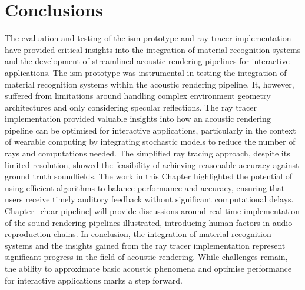 \section{Conclusions}
The evaluation and testing of the \acrshort{ism} prototype and ray tracer implementation have provided critical insights into the integration of material recognition systems and the development of streamlined acoustic rendering pipelines for interactive applications. The \acrshort{ism} prototype was instrumental in testing the integration of material recognition systems within the acoustic rendering pipeline. It, however, suffered from limitations around handling complex environment geometry architectures and only considering specular reflections. The ray tracer implementation provided valuable insights into how an acoustic rendering pipeline can be optimised for interactive applications, particularly in the context of wearable computing by integrating stochastic models to reduce the number of rays and computations needed. The simplified ray tracing approach, despite its limited resolution, showed the feasibility of achieving reasonable accuracy against ground truth soundfields. The work in this Chapter highlighted the potential of using efficient algorithms to balance performance and accuracy, ensuring that users receive timely auditory feedback without significant computational delays. Chapter~\ref{ch:ar-pipeline} will provide discussions around real-time implementation of the sound rendering pipelines illustrated, introducing human factors in audio reproduction chains. In conclusion, the integration of material recognition systems and the insights gained from the ray tracer implementation represent significant progress in the field of acoustic rendering. While challenges remain, the ability to approximate basic acoustic phenomena and optimise performance for interactive applications marks a step forward.
